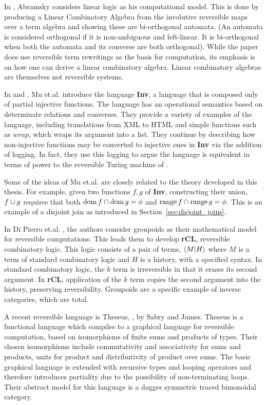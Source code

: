 In \cite{abramsky05:reversible}, Abramsky considers linear logic as his computational model. This is
done by producing a Linear Combinatory Algebra \cite{abramsky02:GOI} from the involutive reversible
maps over a term algebra and showing these are bi-orthogonal automata. (An automata is considered
orthogonal if it is non-ambiguous and left-linear. It is bi-orthogonal when both the automata and
its converse are both orthogonal). While the paper does use reversible term rewritings as the
basis for computation, its emphasis is on how one can derive a linear combinatory algebra.
Linear combinatory algebras are themselves not reversible systems.

In \cite{mu06bidirectional} and \cite{muetal04:injreversible}, Mu et.al. introduce the language
\textbf{Inv}, a language that is composed only of partial injective functions. The language has an
operational semantics based on determinate relations and converses. They provide a variety of examples of the
language, including translations from XML to HTML and simple functions such as $wrap$, which wraps
its argument into a list. They continue by describing how non-injective functions may be converted to
injective ones in \textbf{Inv} via the addition of logging. In fact, they use this logging to argue
the language is equivalent in terms of power to the reversible Turing machine of
\cite{bennett:1973reverse}.

Some of the ideas of Mu et.al. are closely related to the theory developed in this thesis. For
example,  given two functions $f,g$ of \textbf{Inv}, constructing their union, $f\cup g$ requires
that both $\operatorname*{dom} f \cap \operatorname*{dom} g = \phi$ and $\operatorname*{range} f \cap \operatorname*{range} g =
\phi$. This is an example of a disjoint join as introduced in Section~\ref{sec:disjoint_joins}.

In Di Pierro et.al. \cite{DiPierro200625}, the authors consider groupoids as their mathematical
model for reversible computations. This leads them to develop \textbf{rCL}, reversible combinatory
logic. This logic consists of a pair of terms, $\langle M|H\rangle$ where $M$ is a term of standard combinatory
logic and $H$ is a history, with a specified syntax. In standard combinatory logic, the $k$ term is
irreversible in that it erases its second argument. In \textbf{rCL}, application of the $k$ term
copies the second argument into the history, preserving reversibility. Groupoids are a specific
example of inverse categories, which are total.

A recent reversible language is Theseus, \cite{james2014theseus}, by Sabry and James. Theseus is a
functional language which compiles to a graphical language
\cite{james2013isomorphic,james2012information} for reversible computation, based on
isomorphisms of finite sums and products of types. Their chosen isomorphisms include commutativity
and associativity for sums and products, units for product and distributivity of product over
sums. The basic graphical language is extended with recursive types and looping operators and
therefore introduces partiality due to the possibility of non-terminating loops. Their abstract
model for this language is a dagger symmetric traced bimonoidal category\cite{selinger05:dagger}.

